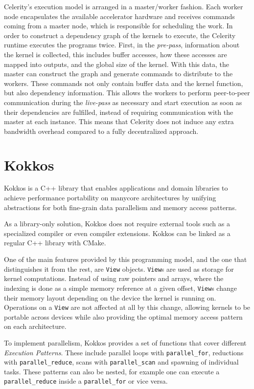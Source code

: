 Celerity's execution model is arranged in a master/worker fashion. Each worker node encapsulates the available accelerator hardware and receives commands coming from a master node, which is responsible for scheduling the work. In order to construct a dependency graph of the kernels to execute, the Celerity runtime executes the programs twice. First, in the \textit{pre-pass}, information about the kernel is collected, this includes buffer accesses, how these accesses are mapped into outputs, and the global size of the kernel. With this data, the master can construct the graph and generate commands to distribute to the workers. These commands not only contain buffer data and the kernel function, but also dependency information. This allows the workers to perform peer-to-peer communication during the \textit{live-pass} as necessary and start execution as soon as their dependencies are fulfilled, instead of requiring communication with the master at each instance. This means that Celerity does not induce any extra bandwidth overhead compared to a fully decentralized approach.

\section{Kokkos} \label{sect:kokkos}
Kokkos \cite{kokkos} is a C++ library that enables applications and domain libraries to achieve performance portability on manycore architectures by unifying abstractions for both fine-grain data parallelism and memory access patterns.

As a library-only solution, Kokkos does not require external tools such as a specialized compiler or even compiler extensions. Kokkos can be linked as a regular C++ library with CMake.

One of the main features provided by this programming model, and the one that distinguishes it from the rest, are \texttt{View} objects. \texttt{View}s are used as storage for kernel computations. Instead of using raw pointers and arrays, where the indexing is done as a simple memory reference at a given offset, \texttt{View}s change their memory layout depending on the device the kernel is running on. Operations on a \texttt{View} are not affected at all by this change, allowing kernels to be portable across devices while also providing the optimal memory access pattern on each architecture.

To implement parallelism, Kokkos provides a set of functions that cover different \textit{Execution Patterns}. These include parallel loops with \texttt{parallel\_for}, reductions with \texttt{parallel\_reduce}, scans with \texttt{parallel\_scan} and spawning of individual tasks. These patterns can also be nested, for example one can execute a \texttt{parallel\_reduce} inside a \texttt{parallel\_for} or vice versa.

